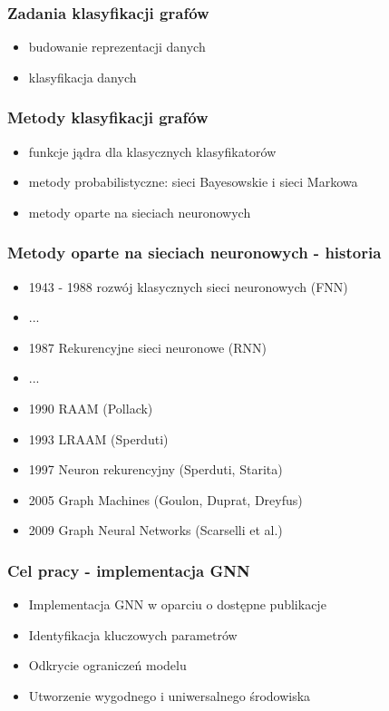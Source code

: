 \documentclass{beamer}
\begin{document}
\begin{frame}
\frametitle{Zadania klasyfikacji grafów}
\begin{itemize}
	\item budowanie reprezentacji danych
	\item klasyfikacja danych
\end{itemize}
\end{frame}

\begin{frame}
\frametitle{Metody klasyfikacji grafów}
\begin{itemize}
	\item funkcje jądra dla klasycznych klasyfikatorów
	\item metody probabilistyczne: sieci Bayesowskie i sieci Markowa
	\item metody oparte na sieciach neuronowych
\end{itemize}
\end{frame}

\begin{frame}
\frametitle{Metody oparte na sieciach neuronowych - historia}
\begin{itemize}
	\item 1943 - 1988 rozwój klasycznych sieci neuronowych (FNN)
	\item ...
	\item 1987 Rekurencyjne sieci neuronowe (RNN)
	\item ...
	\item 1990 RAAM (Pollack)
	\item 1993 LRAAM (Sperduti)
	\item 1997 Neuron rekurencyjny (Sperduti, Starita)
	\item 2005 Graph Machines (Goulon, Duprat, Dreyfus)
	\item 2009 Graph Neural Networks (Scarselli et al.)
\end{itemize}
\end{frame}

\begin{frame}
\frametitle{Cel pracy - implementacja GNN}
\begin{itemize}
	\item Implementacja GNN w oparciu o dostępne publikacje
	\item Identyfikacja kluczowych parametrów
	\item Odkrycie ograniczeń modelu
	\item Utworzenie wygodnego i uniwersalnego środowiska
\end{itemize}
\end{frame}
\end{document}

